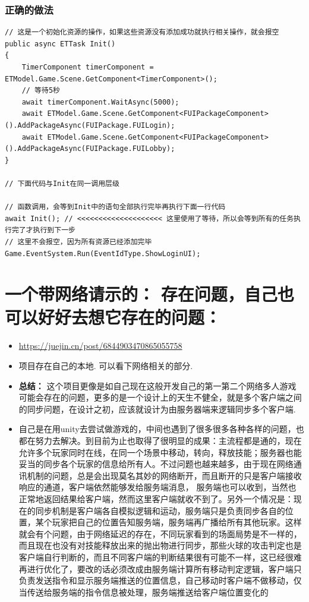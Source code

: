 \documentclass[9pt, b5paper]{article}
\begin{document}
\subsubsection{正确的做法}
\label{sec-5-3-2}
\begin{verbatim}
// 这是一个初始化资源的操作，如果这些资源没有添加成功就执行相关操作，就会报空
public async ETTask Init() 
{
	TimerComponent timerComponent = ETModel.Game.Scene.GetComponent<TimerComponent>();
	// 等待5秒
	await timerComponent.WaitAsync(5000);
	await ETModel.Game.Scene.GetComponent<FUIPackageComponent>().AddPackageAsync(FUIPackage.FUILogin);
	await ETModel.Game.Scene.GetComponent<FUIPackageComponent>().AddPackageAsync(FUIPackage.FUILobby);
}

// 下面代码与Init在同一调用层级

// 函数调用，会等到Init中的语句全部执行完毕再执行下面一行代码
await Init(); // <<<<<<<<<<<<<<<<<<<< 这里使用了等待，所以会等到所有的任务执行完了才执行到下一步
// 这里不会报空，因为所有资源已经添加完毕
Game.EventSystem.Run(EventIdType.ShowLoginUI);
\end{verbatim}

\section{一个带网络请示的： 存在问题，自己也可以好好去想它存在的问题：}
\label{sec-6}
\begin{itemize}
\item \url{https://juejin.cn/post/6844903470865055758}
\item 项目存在自己的本地. 可以看下网络相关的部分.
\item \textbf{总结：} 这个项目更像是如自己现在这般开发自己的第一第二个网络多人游戏可能会存在的问题，更多的是一个设计上的天生不健全，就是多个客户端之间的同步问题，在设计之初，应该就设计为由服务器端来逻辑同步多个客户端.
\item 自己是在用unity去尝试做游戏的，中间也遇到了很多很多各种各样的问题，也都在努力去解决。到目前为止也取得了很明显的成果：主流程都是通的，现在允许多个玩家同时在线，在同一个场景中移动，转向，释放技能；服务器也能妥当的同步各个玩家的信息给所有人。不过问题也越来越多，由于现在网络通讯机制的问题，总是会出现莫名其妙的网络断开，而且断开的只是客户端接收响应的通道，客户端依然能够发给服务端消息， 服务端也可以收到，当然也正常地返回结果给客户端，然而这里客户端就收不到了。另外一个情况是：现在的同步机制是客户端各自模拟逻辑和运动，服务端只是负责同步各自的位置，某个玩家把自己的位置告知服务端，服务端再广播给所有其他玩家。这样就会有个问题，由于网络延迟的存在，不同玩家看到的场面局势是不一样的，而且现在也没有对技能释放出来的抛出物进行同步，那些火球的攻击判定也是客户端自行判断的，而且不同客户端的判断结果很有可能不一样，这已经很难再进行优化了，要改的话必须改成由服务端计算所有移动判定逻辑，客户端只负责发送指令和显示服务端推送的位置信息，自己移动时客户端不做移动，仅当传送给服务端的指令信息被处理，服务端推送给客户端位置变化的
\end{itemize}
\end{document}
